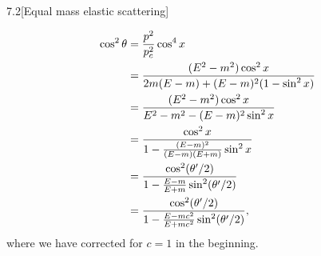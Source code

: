 \documentclass[12pt]{article}
\begin{document}
\begin{problem}{7.2}[Equal mass elastic scattering]
\begin{solution}
\begin{align}
    \cos^2\theta
    &=\frac{p^2}{p_c^2}\cos^4x\notag\\
    &=\frac{(E^2-m^2)\cos^2x}{2m(E-m)+(E-m)^2(1-\sin^2x)}\notag\\
    &=\frac{(E^2-m^2)\cos^2x}{E^2-m^2-(E-m)^2\sin^2x}\notag\\
    &=\frac{\cos^2x}{1-\frac{(E-m)^2}{(E-m)(E+m)}\sin^2x}\notag\\
    &=\frac{\cos^2(\theta'/2)}{1-\frac{E-m}{E+m}\sin^2(\theta'/2)}\notag\\
    &=\frac{\cos^2(\theta'/2)}{1-\frac{E-mc^2}{E+mc^2}\sin^2(\theta'/2)},
\end{align}
where we have corrected for $c=1$ in the beginning.
\end{solution}
\end{problem}
\newpage
\end{document}

